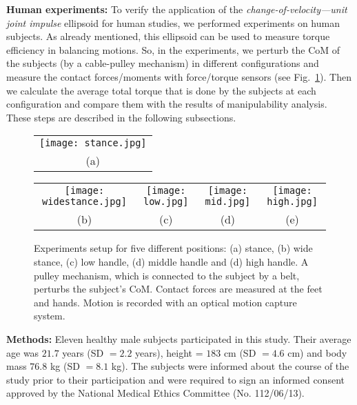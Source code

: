 \textbf{Human experiments:} To verify the application of the \textit{change-of-velocity---unit joint 
	impulse} ellipsoid for human studies, we performed experiments on human
subjects.  As already mentioned, this ellipsoid can be used to measure torque
efficiency in balancing motions.  So, in the experiments, we perturb the CoM
of the subjects (by a cable-pulley mechanism) in different configurations and
measure the contact forces/moments with force/torque sensors (see
Fig.~\ref{experimentsetup}).  Then we calculate the average total torque that
is done by the subjects at each configuration and compare them with the
results of manipulability analysis.  These steps are described in the
following subsections.

\begin{figure}
	\centering
	\begin{tabular}{c}
		\texttt{[image: stance.jpg]} \\
		(a)\\
		
	\end{tabular}
	\centering
	\begin{tabular}{cccc}
		\texttt{[image: widestance.jpg]} &
		\texttt{[image: low.jpg]} &
		\texttt{[image: mid.jpg]} &
		\texttt{[image: high.jpg]} \\
		(b) & (c) & (d) & (e)
	\end{tabular}
	\caption{Experiments setup for five different positions: (a) stance, (b)
		wide stance, (c) low handle, (d) middle handle and (d) high handle.  A
		pulley mechanism, which is connected to the subject by a belt, perturbs
		the subject's CoM. Contact forces are measured at the feet and hands.
		Motion is recorded with an optical motion capture system.}
	\label{experimentsetup}
\end{figure}


\textbf{Methods:} Eleven healthy male subjects participated in this study.  Their average age
was $21.7$ years (SD $=2.2$ years), height = $183$ cm (SD $=4.6$ cm) and body
mass $76.8$ kg (SD $=8.1$ kg).  The subjects were informed about the course of
the study prior to their participation and were required to sign an informed
consent approved by the National Medical Ethics Committee (No. 112/06/13).


